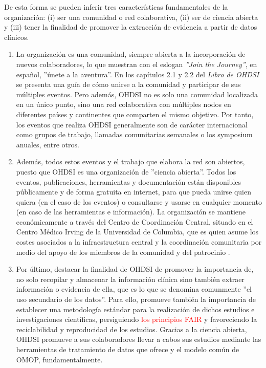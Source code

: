 De esta forma se pueden inferir tres características fundamentales de la organización: (i) ser una comunidad o red colaborativa, (ii) ser de ciencia abierta y (iii) tener la finalidad de promover la extracción de evidencia a partir de datos clínicos.

\begin{enumerate}[label=\roman*.]
    \item La organización es una comunidad, siempre abierta a la incorporación de nuevos colaboradores, lo que muestran con el eslogan \textit{''Join the Journey''}, en español, ''únete a la aventura''. En los capítulos 2.1 y 2.2 del \textit{Libro de OHDSI} se presenta una guía de cómo unirse a la comunidad y participar de sus múltiples eventos. Pero además, OHDSI no es solo una comunidad localizada en un único punto, sino una red colaborativa con múltiples nodos en diferentes países y continentes que comparten el mismo objetivo. Por tanto, los eventos que realiza OHDSI generalmente son de carácter internacional como grupos de trabajo, llamadas comunitarias semanales o los symposium anuales, entre otros.

    \item Además, todos estos eventos y el trabajo que elabora la red son abiertos, puesto que OHDSI es una organización de ''ciencia abierta''. Todos los eventos, publicaciones, herramientas y documentación están disponibles públicamente y de forma gratuita en internet, para que pueda unirse quien quiera (en el caso de los eventos) o consultarse y usarse en cualquier momento (en caso de las herramientas e información). La organización se mantiene económicamente a través del Centro de Coordinación Central, situado en el Centro Médico Irving de la Universidad de Columbia, que es quien asume los costes asociados a la infraestructura central y la coordinación comunitaria por medio del apoyo de los miembros de la comunidad y del patrocinio \cite{OHDSIwebsite}.

    \item Por último, destacar la finalidad de OHDSI de promover la importancia de, no solo recopilar y almacenar la información clínica sino también extraer información o evidencia de ella, que es lo que se denomina comunmente ''el uso secundario de los datos''. Para ello, promueve también la importancia de establecer una metodología estándar para la realización de dichos estudios e investigaciones científicas, persiguiendo \textcolor{red}{los principios FAIR }y favoreciendo la reciclabilidad y reproducidad de los estudios. Gracias a la ciencia abierta, OHDSI promueve a sus colaboradores llevar a cabos sus estudios mediante las herramientas de tratamiento de datos que ofrece y el modelo común de OMOP, fundamentalmente.
    
    
\end{enumerate}

